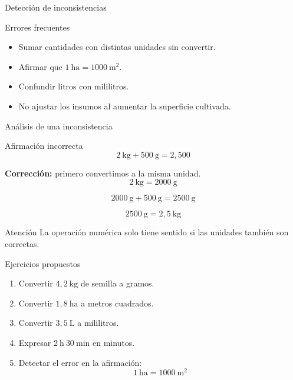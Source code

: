 \documentclass[handout,aspectratio=169,10pt]{beamer}
\newcommand{\alertacaja}[1]{
	\begin{alertblock}{Atención}
		#1
	\end{alertblock}
}
\begin{document}
	\begin{frame}{Detección de inconsistencias}
		\begin{alertblock}{Errores frecuentes}
			\begin{itemize}[<+->]
				\item Sumar cantidades con distintas unidades sin convertir.
				\item Afirmar que \(1\ \text{ha} = 1000\ \text{m}^2\).
				\item Confundir litros con mililitros.
				\item No ajustar los insumos al aumentar la superficie cultivada.
			\end{itemize}
		\end{alertblock}
	\end{frame}
	
	\begin{frame}{Análisis de una inconsistencia}
		\begin{block}{Afirmación incorrecta}
			\[
			2\ \text{kg} + 500\ \text{g} = 2{,}500
			\]
		\end{block}
		
		\pause
		\textbf{Corrección:} primero convertimos a la misma unidad.
		\[
		2\ \text{kg} = 2000\ \text{g}
		\]
		
		\pause
		\[
		2000\ \text{g} + 500\ \text{g} = 2500\ \text{g}
		\]
		
		\pause
		\[
		2500\ \text{g} = 2{,}5\ \text{kg}
		\]
		
		\pause
		\alertacaja{La operación numérica solo tiene sentido si las unidades también son correctas.}
	\end{frame}
	
	\begin{frame}{Ejercicios propuestos}
		\small
		\begin{enumerate}[<+->]
			\item Convertir \(4{,}2\ \text{kg}\) de semilla a gramos.
			\item Convertir \(1{,}8\ \text{ha}\) a metros cuadrados.
			\item Convertir \(3{,}5\ \text{L}\) a mililitros.
			\item Expresar \(2\ \text{h}\ 30\ \text{min}\) en minutos.
			\item Detectar el error en la afirmación:
			\[
			1\ \text{ha} = 1000\ \text{m}^2
			\]
		\end{enumerate}
	\end{frame}
	
\end{document}

